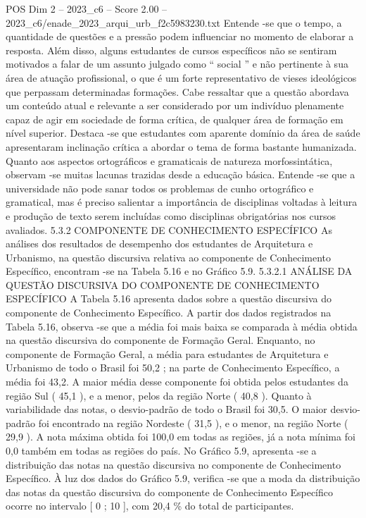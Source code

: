 \begin{textsample}{POS Dim 2 – 2023\_c6 – Score 2.00 – 2023\_c6/enade\_2023\_arqui\_urb\_f2c5983230.txt}
Entende -se que o tempo, a quantidade de questões e a pressão podem influenciar no momento de elaborar a resposta.
Além disso, alguns estudantes de cursos específicos não se sentiram motivados a falar de um assunto julgado como “ social ” e não pertinente à sua área de atuação profissional, o que é um forte representativo de vieses ideológicos que perpassam determinadas formações.
Cabe ressaltar que a questão abordava um conteúdo atual e relevante a ser considerado por um indivíduo plenamente capaz de agir em sociedade de forma crítica, de qualquer área de formação em nível superior.
Destaca -se que estudantes com aparente domínio da área de saúde apresentaram inclinação crítica a abordar o tema de forma bastante humanizada.
Quanto aos aspectos ortográficos e gramaticais de natureza morfossintática, observam -se muitas lacunas trazidas desde a educação básica.
Entende -se que a universidade não pode sanar todos os problemas de cunho ortográfico e gramatical, mas é preciso salientar a importância de disciplinas voltadas à leitura e produção de texto serem incluídas como disciplinas obrigatórias nos cursos avaliados. 5.3.2 COMPONENTE DE CONHECIMENTO ESPECÍFICO As análises dos resultados de desempenho dos estudantes de Arquitetura e Urbanismo, na questão discursiva relativa ao componente de Conhecimento Específico, encontram -se na Tabela 5.16 e no Gráfico 5.9. 5.3.2.1 ANÁLISE DA QUESTÃO DISCURSIVA DO COMPONENTE DE CONHECIMENTO ESPECÍFICO A Tabela 5.16 apresenta dados sobre a questão discursiva do componente de Conhecimento Específico.
A partir dos dados registrados na Tabela 5.16, observa -se que a média foi mais baixa se comparada à média obtida na questão discursiva do componente de Formação Geral.
Enquanto, no componente de Formação Geral, a média para estudantes de Arquitetura e Urbanismo de todo o Brasil foi 50,2 ; na parte de Conhecimento Específico, a média foi 43,2.
A maior média desse componente foi obtida pelos estudantes da região Sul ( 45,1 ), e a menor, pelos da região Norte ( 40,8 ).
Quanto à variabilidade das notas, o desvio-padrão de todo o Brasil foi 30,5.
O maior desvio-padrão foi encontrado na região Nordeste ( 31,5 ), e o menor, na região Norte ( 29,9 ).
A nota máxima obtida foi 100,0 em todas as regiões, já a nota mínima foi 0,0 também em todas as regiões do país.
No Gráfico 5.9, apresenta -se a distribuição das notas na questão discursiva no componente de Conhecimento Específico.
À luz dos dados do Gráfico 5.9, verifica -se que a moda da distribuição das notas da questão discursiva do componente de Conhecimento Específico ocorre no intervalo [ 0 ; 10 ], com 20,4 \% do total de participantes.

\end{textsample}
